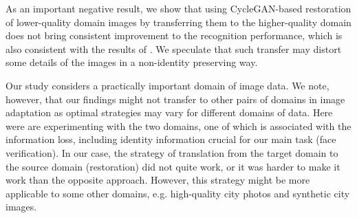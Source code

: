 
As an important negative result, we show that using CycleGAN-based restoration of lower-quality domain images by transferring them to the higher-quality domain does not bring consistent improvement to the recognition performance, which is also consistent with the results of \citep{SohnLZY0C17}. We speculate that such transfer may distort some details of the images in a non-identity preserving way.

Our study considers a practically important domain of image data. 
We note, however, that our findings might not transfer to other pairs of domains in image adaptation as optimal strategies may vary for different domains of data. Here were are experimenting with the two domains, one of which is associated with the information loss, including identity information crucial for our main task (face verification). In our case, the strategy of translation from the target domain to the source domain (\‘restoration\’) did not quite work, or it was harder to make it work than the opposite approach. However, this strategy might be more applicable to some other domains, e.g. high-quality city photos and synthetic city images.



 
